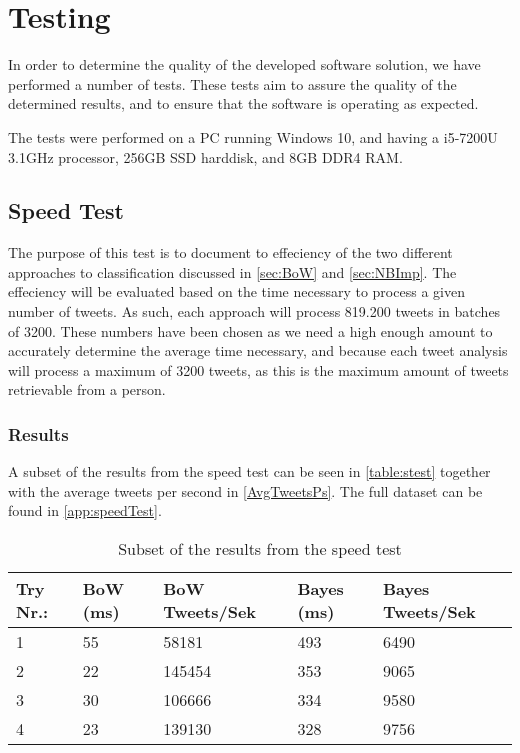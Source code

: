 \chapter{Testing}\label{cha:testing}
In order to determine the quality of the developed software solution, we have
performed a number of tests. These tests aim to assure the quality of the
determined results, and to ensure that the software is operating as expected.\nl

The tests were performed on a PC running Windows 10, and having a i5-7200U
3.1GHz processor, 256GB SSD harddisk, and 8GB DDR4 RAM.




\section{Speed Test}\label{speedtestlavel}
The purpose of this test is to document to effeciency of the two different
approaches to classification discussed in \autoref{sec:BoW} and
\autoref{sec:NBImp}. The effeciency will be evaluated based on the time
necessary to process a given number of tweets. As such, each approach will
process 819.200 tweets in batches of 3200. These numbers have been chosen as we
need a high enough amount to accurately determine the average time necessary,
and because each tweet analysis will process a maximum of 3200 tweets, as this
is the maximum amount of tweets retrievable from a person.

\subsection*{Results}
A subset of the results from the speed test can be seen in \autoref{table:stest}
together with the average tweets per second in \autoref{AvgTweetsPs}. The
full dataset can be found in \autoref{app:speedTest}.

\begin{table}[H]\centering
\begin{tabular}{|l|l|l|l|l|}
\hline
Try Nr.:	&	BoW (ms)	&	BoW Tweets/Sek	&	Bayes (ms)	&	Bayes Tweets/Sek	\\\hline
1	&	55	&	58181	&	493	&	6490 \\\hline
2	&	22	&	145454	&	353	&	9065 \\\hline
3	&	30	&	106666	&	334	&	9580 \\\hline
4	&	23	&	139130	&	328	&	9756 \\\hline		
\end{tabular}
\caption{Subset of the results from the speed test}
\label{table:stest}
\end{table}

